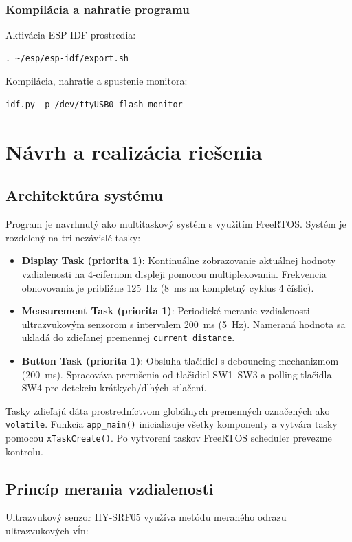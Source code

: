 \documentclass[a4paper, 11pt]{article}
\begin{document}
\subsubsection{Kompilácia a nahratie programu}
Aktivácia ESP-IDF prostredia:
\begin{verbatim}
. ~/esp/esp-idf/export.sh
\end{verbatim}

Kompilácia, nahratie a spustenie monitora:
\begin{verbatim}
idf.py -p /dev/ttyUSB0 flash monitor
\end{verbatim}

\section{Návrh a realizácia riešenia}

\subsection{Architektúra systému}
Program je navrhnutý ako multitaskový systém s využitím FreeRTOS. Systém je rozdelený na tri nezávislé tasky:

\begin{itemize}
    \item \textbf{Display Task (priorita 1)}: Kontinuálne zobrazovanie aktuálnej hodnoty vzdialenosti na 4-cifernom displeji pomocou multiplexovania. Frekvencia obnovovania je približne 125~Hz (8~ms na kompletný cyklus 4 číslic).
    
    \item \textbf{Measurement Task (priorita 1)}: Periodické meranie vzdialenosti ultrazvukovým senzorom s intervalem 200~ms (5~Hz). Nameraná hodnota sa ukladá do zdieľanej premennej \texttt{current\_distance}.
    
    \item \textbf{Button Task (priorita 1)}: Obsluha tlačidiel s debouncing mechanizmom (200~ms). Spracováva prerušenia od tlačidiel SW1--SW3 a polling tlačidla SW4 pre detekciu krátkych/dlhých stlačení.
\end{itemize}

Tasky zdieľajú dáta prostredníctvom globálnych premenných označených ako \texttt{volatile}. Funkcia \texttt{app\_main()} inicializuje všetky komponenty a vytvára tasky pomocou \texttt{xTaskCreate()}. Po vytvorení taskov FreeRTOS scheduler prevezme kontrolu.

\subsection{Princíp merania vzdialenosti}
Ultrazvukový senzor HY-SRF05 využíva metódu meraného odrazu ultrazvukových vĺn:
\end{document}
